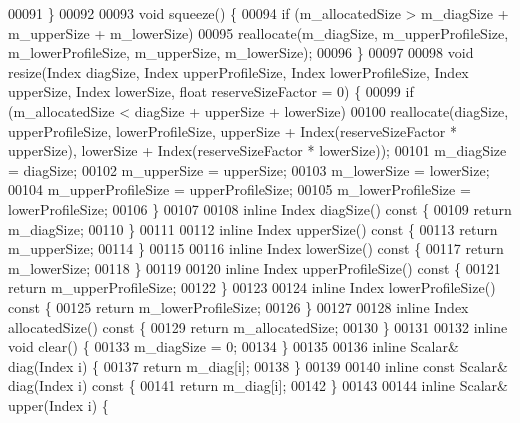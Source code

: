 \begin{DoxyCode}
00091     \}
00092 
00093     \textcolor{keywordtype}{void} squeeze() \{
00094         \textcolor{keywordflow}{if} (m\_allocatedSize > m\_diagSize + m\_upperSize + m\_lowerSize)
00095             reallocate(m\_diagSize, m\_upperProfileSize, m\_lowerProfileSize, m\_upperSize, m\_lowerSize);
00096     \}
00097 
00098     \textcolor{keywordtype}{void} resize(Index diagSize, Index upperProfileSize, Index lowerProfileSize, Index upperSize, Index 
      lowerSize, \textcolor{keywordtype}{float} reserveSizeFactor = 0) \{
00099         \textcolor{keywordflow}{if} (m\_allocatedSize < diagSize + upperSize + lowerSize)
00100             reallocate(diagSize, upperProfileSize, lowerProfileSize, upperSize + Index(reserveSizeFactor * 
      upperSize), lowerSize + Index(reserveSizeFactor * lowerSize));
00101         m\_diagSize = diagSize;
00102         m\_upperSize = upperSize;
00103         m\_lowerSize = lowerSize;
00104         m\_upperProfileSize = upperProfileSize;
00105         m\_lowerProfileSize = lowerProfileSize;
00106     \}
00107 
00108     \textcolor{keyword}{inline} Index diagSize()\textcolor{keyword}{ const }\{
00109         \textcolor{keywordflow}{return} m\_diagSize;
00110     \}
00111 
00112     \textcolor{keyword}{inline} Index upperSize()\textcolor{keyword}{ const }\{
00113         \textcolor{keywordflow}{return} m\_upperSize;
00114     \}
00115 
00116     \textcolor{keyword}{inline} Index lowerSize()\textcolor{keyword}{ const }\{
00117         \textcolor{keywordflow}{return} m\_lowerSize;
00118     \}
00119 
00120     \textcolor{keyword}{inline} Index upperProfileSize()\textcolor{keyword}{ const }\{
00121         \textcolor{keywordflow}{return} m\_upperProfileSize;
00122     \}
00123 
00124     \textcolor{keyword}{inline} Index lowerProfileSize()\textcolor{keyword}{ const }\{
00125         \textcolor{keywordflow}{return} m\_lowerProfileSize;
00126     \}
00127 
00128     \textcolor{keyword}{inline} Index allocatedSize()\textcolor{keyword}{ const }\{
00129         \textcolor{keywordflow}{return} m\_allocatedSize;
00130     \}
00131 
00132     \textcolor{keyword}{inline} \textcolor{keywordtype}{void} clear() \{
00133         m\_diagSize = 0;
00134     \}
00135 
00136     \textcolor{keyword}{inline} Scalar& diag(Index i) \{
00137         \textcolor{keywordflow}{return} m\_diag[i];
00138     \}
00139 
00140     \textcolor{keyword}{inline} \textcolor{keyword}{const} Scalar& diag(Index i)\textcolor{keyword}{ const }\{
00141         \textcolor{keywordflow}{return} m\_diag[i];
00142     \}
00143 
00144     \textcolor{keyword}{inline} Scalar& upper(Index i) \{

\end{DoxyCode}
